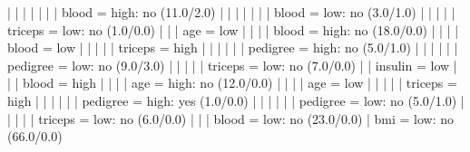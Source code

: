 |   |   |   |   |   |   |   blood = high: no (11.0/2.0)
|   |   |   |   |   |   |   blood = low: no (3.0/1.0)
|   |   |   |   |   triceps = low: no (1.0/0.0)
|   |   |   age = low
|   |   |   |   blood = high: no (18.0/0.0)
|   |   |   |   blood = low
|   |   |   |   |   triceps = high
|   |   |   |   |   |   pedigree = high: no (5.0/1.0)
|   |   |   |   |   |   pedigree = low: no (9.0/3.0)
|   |   |   |   |   triceps = low: no (7.0/0.0)
|   |   insulin = low
|   |   |   blood = high
|   |   |   |   age = high: no (12.0/0.0)
|   |   |   |   age = low
|   |   |   |   |   triceps = high
|   |   |   |   |   |   pedigree = high: yes (1.0/0.0)
|   |   |   |   |   |   pedigree = low: no (5.0/1.0)
|   |   |   |   |   triceps = low: no (6.0/0.0)
|   |   |   blood = low: no (23.0/0.0)
|   bmi = low: no (66.0/0.0)